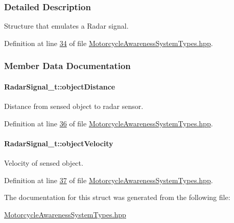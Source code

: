 \subsubsection{Detailed Description}
Structure that emulates a Radar signal. 

Definition at line \hyperlink{MotorcycleAwarenessSystemTypes_8hpp_source_l00034}{34} of file \hyperlink{MotorcycleAwarenessSystemTypes_8hpp_source}{Motorcycle\-Awareness\-System\-Types.\-hpp}.



\subsubsection{Member Data Documentation}
\hypertarget{structRadarSignal__t_a96938fbfb77f208743a36d3f8b37cccb}{
\paragraph[{object\-Distance}]{ Radar\-Signal\-\_\-t\-::object\-Distance}}\label{structRadarSignal__t_a96938fbfb77f208743a36d3f8b37cccb}


Distance from sensed object to radar sensor. 



Definition at line \hyperlink{MotorcycleAwarenessSystemTypes_8hpp_source_l00036}{36} of file \hyperlink{MotorcycleAwarenessSystemTypes_8hpp_source}{Motorcycle\-Awareness\-System\-Types.\-hpp}.

\hypertarget{structRadarSignal__t_a0bbaf402c80288a0819dbbfaded8a44a}{
\paragraph[{object\-Velocity}]{ Radar\-Signal\-\_\-t\-::object\-Velocity}}\label{structRadarSignal__t_a0bbaf402c80288a0819dbbfaded8a44a}


Velocity of sensed object. 



Definition at line \hyperlink{MotorcycleAwarenessSystemTypes_8hpp_source_l00037}{37} of file \hyperlink{MotorcycleAwarenessSystemTypes_8hpp_source}{Motorcycle\-Awareness\-System\-Types.\-hpp}.



The documentation for this struct was generated from the following file\-:\begin{DoxyCompactItemize}
\item 
\hyperlink{MotorcycleAwarenessSystemTypes_8hpp}{Motorcycle\-Awareness\-System\-Types.\-hpp}\end{DoxyCompactItemize}
